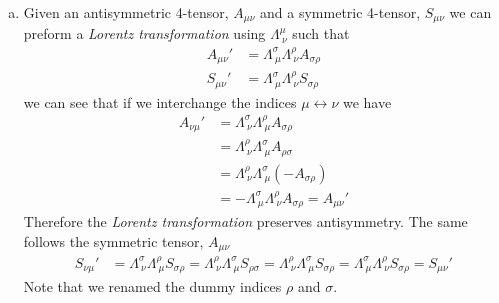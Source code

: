\documentclass[11pt]{article}
\numberwithin{equation}{section}
\begin{document}
\begin{enumerate}[(a)]
\item
    Given an antisymmetric 4-tensor, $A_{\mu\nu}$ and a symmetric 4-tensor, $S_{\mu\nu}$ we can preform a
    \emph{Lorentz transformation} using $\Lambda^{\mu}_{\ \nu}$ such that
    \begin{align*}
        A_{\mu\nu}' &= \Lambda^{\sigma}_{\ \mu}\Lambda^{\rho}_{\ \nu}A_{\sigma\rho}\\
        S_{\mu\nu}' &= \Lambda^{\sigma}_{\ \mu}\Lambda^{\rho}_{\ \nu}S_{\sigma\rho}
    \end{align*}
    we can see that if we interchange the indices $\mu\leftrightarrow\nu$ we have
    \begin{align*}
        A_{\nu\mu}' &= \Lambda^{\sigma}_{\ \nu}\Lambda^{\rho}_{\ \mu}A_{\sigma\rho}\\
        &= \Lambda^{\rho}_{\ \nu}\Lambda^{\sigma}_{\ \mu}A_{\rho\sigma}\\
        &= \Lambda^{\rho}_{\ \nu}\Lambda^{\sigma}_{\ \mu}(-A_{\sigma\rho})\\
        &= -\Lambda^{\sigma}_{\ \mu}\Lambda^{\rho}_{\ \nu}A_{\sigma\rho} = A_{\mu\nu}'
    \end{align*}
    Therefore the \emph{Lorentz transformation} preserves antisymmetry. The same follows the symmetric tensor, 
    $A_{\mu\nu}$
    \begin{align*}
        S_{\nu\mu}' &= \Lambda^{\sigma}_{\ \nu}\Lambda^{\rho}_{\ \mu}S_{\sigma\rho} = \Lambda^{\rho}_{\ \nu}\Lambda^{\sigma}_{\ \mu}S_{\rho\sigma} = \Lambda^{\rho}_{\ \nu}\Lambda^{\sigma}_{\ \mu}S_{\sigma\rho} = \Lambda^{\sigma}_{\ \mu}\Lambda^{\rho}_{\ \nu}S_{\sigma\rho} = S_{\mu\nu}'
    \end{align*}
    Note that we renamed the dummy indices $\rho$ and $\sigma$.

\end{enumerate}

\pagebreak
\end{document}
